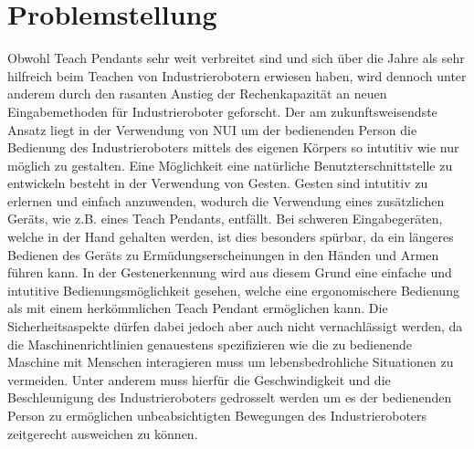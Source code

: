 \section{Problemstellung}
Obwohl Teach Pendants sehr weit verbreitet sind und sich über die Jahre als sehr hilfreich beim Teachen von Industrierobotern erwiesen haben, wird dennoch unter anderem durch den rasanten Anstieg der Rechenkapazität an neuen Eingabemethoden für Industrieroboter geforscht. Der am zukunftsweisendste Ansatz liegt in der Verwendung von NUI um der bedienenden Person die Bedienung des Industrieroboters mittels des eigenen Körpers so intutitiv wie nur möglich zu gestalten. Eine Möglichkeit eine natürliche Benutzterschnittstelle zu entwickeln besteht in der Verwendung von Gesten. Gesten sind intutitiv zu erlernen und einfach anzuwenden, wodurch die Verwendung eines zusätzlichen Geräts, wie z.B. eines Teach Pendants, entfällt. Bei schweren Eingabegeräten, welche in der Hand gehalten werden, ist dies besonders spürbar, da ein längeres Bedienen des Geräts zu Ermüdungserscheinungen in den Händen und Armen führen kann. In der Gestenerkennung wird aus diesem Grund eine einfache und intutitive Bedienungsmöglichkeit gesehen, welche eine ergonomischere Bedienung als mit einem herkömmlichen Teach Pendant ermöglichen kann. Die Sicherheitsaspekte dürfen dabei jedoch aber auch nicht vernachlässigt werden, da die Maschinenrichtlinien genauestens spezifizieren wie die zu bedienende Maschine mit Menschen interagieren muss um lebensbedrohliche Situationen zu vermeiden. Unter anderem muss hierfür die Geschwindigkeit und die Beschleunigung des Industrieroboters gedrosselt werden um es der bedienenden Person zu ermöglichen unbeabsichtigten Bewegungen des Industrieroboters zeitgerecht ausweichen zu können.

